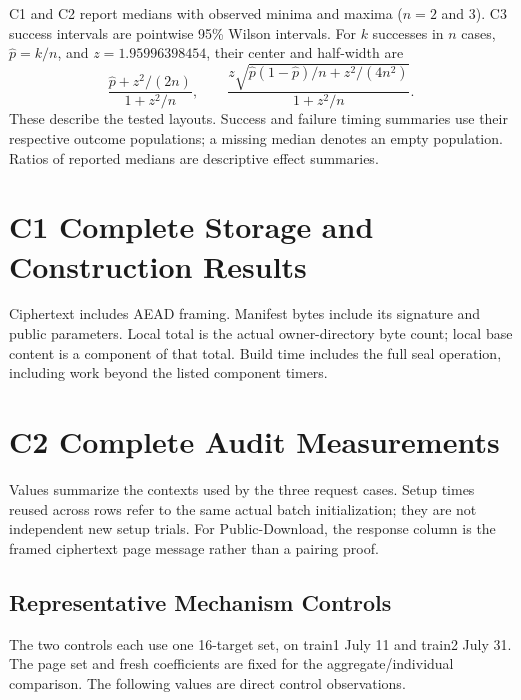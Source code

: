 \documentclass[10pt,journal,onecolumn]{IEEEtran}
\begin{document}
C1 and C2 report medians with observed minima and maxima ($n=2$ and $3$).
C3 success intervals are pointwise 95\% Wilson intervals. For $k$ successes
in $n$ cases, $\widehat p=k/n$, and $z=1.95996398454$, their center and half-width are
\[
\frac{\widehat p+z^2/(2n)}{1+z^2/n},\qquad
\frac{z\sqrt{\widehat p(1-\widehat p)/n+z^2/(4n^2)}}{1+z^2/n}.
\]
These describe the tested layouts. Success and failure timing summaries use
their respective outcome populations; a missing median denotes an empty
population. Ratios of reported medians are descriptive effect summaries.

\section{C1 Complete Storage and Construction Results}





Ciphertext includes AEAD framing. Manifest bytes include its signature and public parameters. Local total is the actual owner-directory byte count; local base content is a component of that total. Build time includes the full seal operation, including work beyond the listed component timers.

\section{C2 Complete Audit Measurements}





Values summarize the contexts used by the three request cases. Setup times reused across rows refer to the same actual batch initialization; they are not independent new setup trials. For Public-Download, the response column is the framed ciphertext page message rather than a pairing proof.

\subsection{Representative Mechanism Controls}
The two controls each use one 16-target set, on train1 July 11 and train2 July 31. The page set and fresh coefficients are fixed for the aggregate/individual comparison. The following values are direct control observations.
\end{document}
